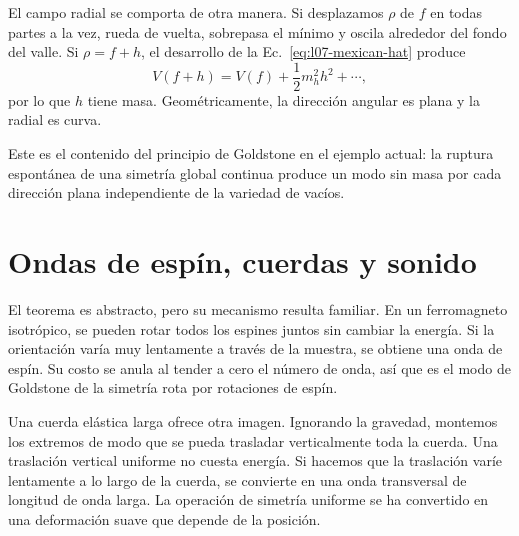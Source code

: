 El campo radial se comporta de otra manera. Si desplazamos \(\rho\) de \(f\) en todas partes a la vez, rueda de vuelta, sobrepasa el mínimo y oscila alrededor del fondo del valle. Si \(\rho=f+h\), el desarrollo de la Ec.~\eqref{eq:l07-mexican-hat} produce
\begin{equation}
  V(f+h)=V(f)+\frac12m_h^2h^2+\cdots,
\end{equation}
por lo que \(h\) tiene masa. Geométricamente, la dirección angular es plana y la radial es curva.

\begin{classroomqa}
\end{classroomqa}

Este es el contenido del principio de Goldstone en el ejemplo actual: la ruptura espontánea de una simetría global continua produce un modo sin masa por cada dirección plana independiente de la variedad de vacíos.

\section{Ondas de espín, cuerdas y sonido}

El teorema es abstracto, pero su mecanismo resulta familiar. En un ferromagneto isotrópico, se pueden rotar todos los espines juntos sin cambiar la energía. Si la orientación varía muy lentamente a través de la muestra, se obtiene una onda de espín. Su costo se anula al tender a cero el número de onda, así que es el modo de Goldstone de la simetría rota por rotaciones de espín.

Una cuerda elástica larga ofrece otra imagen. Ignorando la gravedad, montemos los extremos de modo que se pueda trasladar verticalmente toda la cuerda. Una traslación vertical uniforme no cuesta energía. Si hacemos que la traslación varíe lentamente a lo largo de la cuerda, se convierte en una onda transversal de longitud de onda larga. La operación de simetría uniforme se ha convertido en una deformación suave que depende de la posición.

